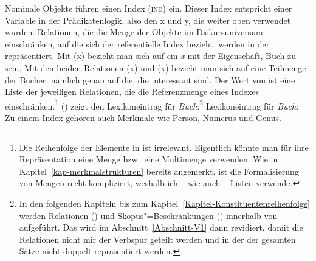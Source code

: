 Nominale Objekte führen einen Index (\textsc{ind}) ein. Dieser Index entspricht einer Variable in
der Prädikatenlogik, also den x und y, die weiter oben verwendet wurden. Relationen, die die Menge
der Objekte im Diskursuniversum einschränken, auf die sich der referentielle Index bezieht, werden
in der \relsl{} repräsentiert. Mit (x) bezieht man sich auf ein \emph{x} mit der
Eigenschaft, Buch zu sein. Mit den beiden Relationen (x) und (x)
bezieht man sich auf eine Teilmenge der Bücher, nämlich genau auf die, die interessant sind.
Der Wert von \rels ist eine Liste der jeweiligen Relationen, die die Referenzmenge eines Indexes einschränken.\footnote{
  Die Reihenfolge der Elemente in \rels ist irrelevant. Eigentlich könnte man für ihre
  Repräsentation eine Menge bzw.\ eine Multimenge verwenden. Wie in Kapitel~\ref{kap-merkmalstrukturen} bereits angemerkt, ist die
  Formalisierung von Mengen recht kompliziert, weshalb ich -- wie \citeauthor*{CFPS2005a} auch – Listen verwende.%
}
() zeigt den Lexikoneintrag für \emph{Buch}:\footnote{
  In den folgenden Kapiteln bis zum Kapitel~\ref{Kapitel-Konstituentenreihenfolge} werden Relationen (\rels)
  und Skopus"=Beschränkungen (\hcons) innerhalb von \cont aufgeführt. Das wird im Abschnitt~\ref{Abschnitt-V1} dann
  revidiert, damit die Relationen nicht mir der Verbspur geteilt werden und in der \relsl der
  gesamten Sätze nicht doppelt repräsentiert werden.
}
\eas
\label{le-buch}%
Lexikoneintrag für \emph{Buch}:\\
\zs
Zu einem Index gehören auch Merkmale wie Person, Numerus und Genus.
